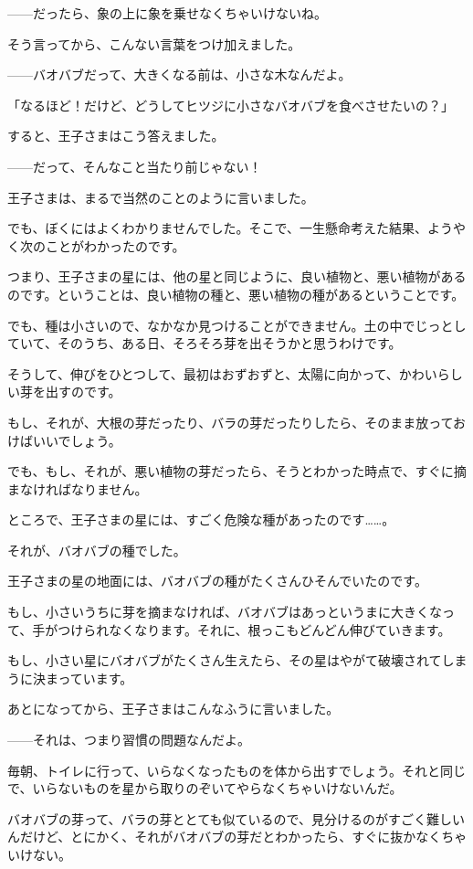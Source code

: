 
——だったら、象の上に象を乗せなくちゃいけないね。

そう言ってから、こんない言葉をつけ加えました。

——バオバブだって、大きくなる前は、小さな木なんだよ。

「なるほど！だけど、どうしてヒツジに小さなバオバブを食べさせたいの？」

すると、王子さまはこう答えました。

——だって、そんなこと当たり前じゃない！

王子さまは、まるで当然のことのように言いました。

でも、ぼくにはよくわかりませんでした。そこで、一生懸命考えた結果、ようやく次のことがわかったのです。

つまり、王子さまの星には、他の星と同じように、良い植物と、悪い植物があるのです。ということは、良い植物の種と、悪い植物の種があるということです。

でも、種は小さいので、なかなか見つけることができません。土の中でじっとしていて、そのうち、ある日、そろそろ芽を出そうかと思うわけです。

そうして、伸びをひとつして、最初はおずおずと、太陽に向かって、かわいらしい芽を出すのです。

もし、それが、大根の芽だったり、バラの芽だったりしたら、そのまま放っておけばいいでしょう。

でも、もし、それが、悪い植物の芽だったら、そうとわかった時点で、すぐに摘まなければなりません。

ところで、王子さまの星には、すごく危険な種があったのです……。

それが、バオバブの種でした。

王子さまの星の地面には、バオバブの種がたくさんひそんでいたのです。

もし、小さいうちに芽を摘まなければ、バオバブはあっというまに大きくなって、手がつけられなくなります。それに、根っこもどんどん伸びていきます。

もし、小さい星にバオバブがたくさん生えたら、その星はやがて破壊されてしまうに決まっています。

あとになってから、王子さまはこんなふうに言いました。

——それは、つまり習慣の問題なんだよ。

毎朝、トイレに行って、いらなくなったものを体から出すでしょう。それと同じで、いらないものを星から取りのぞいてやらなくちゃいけないんだ。

バオバブの芽って、バラの芽ととても似ているので、見分けるのがすごく難しいんだけど、とにかく、それがバオバブの芽だとわかったら、すぐに抜かなくちゃいけない。

